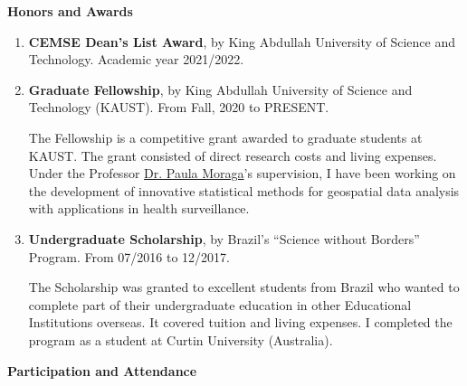 \documentclass[11pt, ]{article}
\begin{document}
\vspace{6pt}

{\Large \textbf{Honors and Awards}}

	\begin{enumerate}
		\item \textbf{CEMSE Dean's List Award}, by King Abdullah University of Science and Technology. Academic year 2021/2022.
		
		\item \textbf{Graduate Fellowship}, by King Abdullah University of Science and Technology (KAUST). From Fall, 2020 to PRESENT.
		
		The Fellowship is a competitive grant awarded to graduate students at KAUST. The grant consisted of direct research costs and living expenses. Under the Professor \href{https://www.paulamoraga.com/}{Dr. Paula Moraga}'s supervision, I have been working on the development of innovative statistical methods for geospatial data analysis with applications in health surveillance.
		
		\item \textbf{Undergraduate Scholarship}, by Brazil's ``Science without Borders'' Program. From 07/2016 to 12/2017.
		
		The Scholarship was granted to excellent students from Brazil who wanted to complete part of their undergraduate education in other Educational Institutions overseas. It covered tuition and living expenses. I completed the program as a student at Curtin University (Australia).
	
	\end{enumerate}
	
\vspace{6pt}

{\Large \textbf{Participation and Attendance}}
\end{document}
